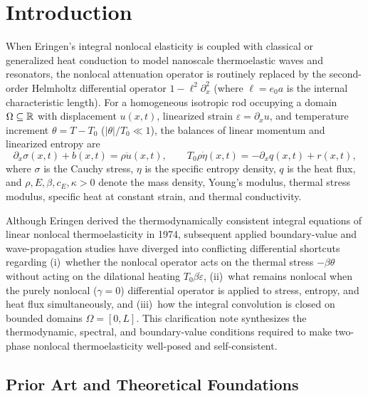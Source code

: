 \section{Introduction}\label{sec:intro}

When Eringen's integral nonlocal elasticity \cite{Eringen1972Linear,Eringen2002} is coupled with classical or generalized heat conduction to model nanoscale thermoelastic waves and resonators, the nonlocal attenuation operator is routinely replaced by the second-order Helmholtz differential operator $1 - \ell^2\partial_x^2$ (where $\ell = e_0 a$ is the internal characteristic length). For a homogeneous isotropic rod occupying a domain $\Omega \subseteq \mathbb{R}$ with displacement $u(x,t)$, linearized strain $\varepsilon = \partial_x u$, and temperature increment $\theta = T - T_0$ ($|\theta|/T_0 \ll 1$), the balances of linear momentum and linearized entropy are
\begin{equation}\label{eq:balance_laws}
  \partial_x \sigma(x,t) + b(x,t) = \rho \ddot{u}(x,t), \qquad
  T_0 \rho \dot{\eta}(x,t) = -\partial_x q(x,t) + r(x,t),
\end{equation}
where $\sigma$ is the Cauchy stress, $\eta$ is the specific entropy density, $q$ is the heat flux, and $\rho, E, \beta, c_E, \kappa > 0$ denote the mass density, Young's modulus, thermal stress modulus, specific heat at constant strain, and thermal conductivity.

Although Eringen \cite{Eringen1974} derived the thermodynamically consistent integral equations of linear nonlocal thermoelasticity in 1974, subsequent applied boundary-value and wave-propagation studies have diverged into conflicting differential shortcuts regarding (i)~whether the nonlocal operator acts on the thermal stress $-\beta\theta$ without acting on the dilational heating $T_0\beta\dot{\varepsilon}$, (ii)~what remains nonlocal when the purely nonlocal ($\gamma = 0$) differential operator is applied to stress, entropy, and heat flux simultaneously, and (iii)~how the integral convolution is closed on bounded domains $\Omega = [0,L]$. This clarification note synthesizes the thermodynamic, spectral, and boundary-value conditions required to make two-phase nonlocal thermoelasticity well-posed and self-consistent.

\subsection{Prior Art and Theoretical Foundations}\label{subsec:prior_art}


